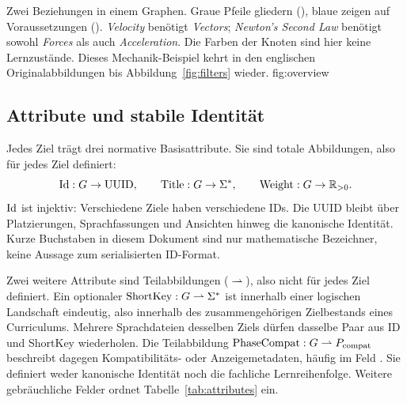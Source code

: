 {Zwei Beziehungen in einem Graphen. Graue Pfeile gliedern
(), blaue zeigen auf Voraussetzungen ().
\emph{Velocity} benötigt \emph{Vectors};
\emph{Newton's Second Law} benötigt sowohl \emph{Forces} als auch
\emph{Acceleration}. Die Farben der Knoten sind hier keine Lernzustände.
Dieses Mechanik-Beispiel kehrt in den englischen Originalabbildungen bis
Abbildung~\ref{fig:filters} wieder.}
{fig:overview}

\subsection{Attribute und stabile Identität}
Jedes Ziel trägt drei normative Basisattribute. Sie sind totale
Abbildungen, also für jedes Ziel definiert:
\[
 \operatorname{Id}:G\to\mathrm{UUID},\qquad \operatorname{Title}:G\to\Sigma^*,\qquad
 \operatorname{Weight}:G\to\mathbb{R}_{>0}.
\]
$\operatorname{Id}$ ist injektiv: Verschiedene Ziele haben verschiedene IDs.
Die UUID bleibt über Platzierungen, Sprachfassungen und Ansichten hinweg
die kanonische Identität. Kurze Buchstaben in diesem Dokument sind nur
mathematische Bezeichner, keine Aussage zum serialisierten ID-Format.

Zwei weitere Attribute sind Teilabbildungen ($\rightharpoonup$), also nicht
für jedes Ziel definiert. Ein optionaler
$\operatorname{ShortKey}:G\rightharpoonup\Sigma^*$ ist innerhalb einer logischen
Landschaft eindeutig, also innerhalb des zusammengehörigen Zielbestands
eines Curriculums. Mehrere Sprachdateien desselben Ziels
dürfen dasselbe Paar aus ID und ShortKey wiederholen. Die Teilabbildung
$\operatorname{PhaseCompat}:G\rightharpoonup P_{\mathrm{compat}}$ beschreibt dagegen
Kompatibilitäts- oder Anzeigemetadaten, häufig im Feld .
Sie definiert weder kanonische Identität noch die fachliche Lernreihenfolge.
Weitere gebräuchliche Felder ordnet Tabelle~\ref{tab:attributes} ein.


